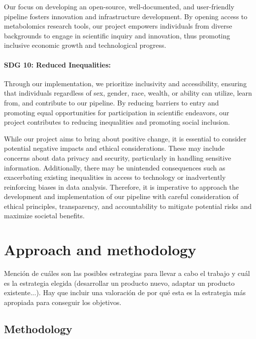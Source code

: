 \documentclass[ENG, BIB]{TFUOC}%
\begin{document}
Our focus on developing an open-source, well-documented, and user-friendly pipeline fosters innovation and infrastructure development. By opening access to metabolomics research tools, our project empowers individuals from diverse backgrounds to engage in scientific inquiry and innovation, thus promoting inclusive economic growth and technological progress.
 
\subsubsection{SDG 10: Reduced Inequalities:} 

Through our implementation, we prioritize inclusivity and accessibility, ensuring that individuals regardless of sex, gender, race, wealth, or ability can utilize, learn from, and contribute to our pipeline. By reducing barriers to entry and promoting equal opportunities for participation in scientific endeavors, our project contributes to reducing inequalities and promoting social inclusion. 

\vspace{18pt}

While our project aims to bring about positive change, it is essential to consider potential negative impacts and ethical considerations. These may include concerns about data privacy and security, particularly in handling sensitive information. Additionally, there may be unintended consequences such as exacerbating existing inequalities in access to technology or inadvertently reinforcing biases in data analysis. Therefore, it is imperative to approach the development and implementation of our pipeline with careful consideration of ethical principles, transparency, and accountability to mitigate potential risks and maximize societal benefits.

\chapter{Approach and methodology}

Mención de cuáles son las posibles estrategias para llevar a cabo el trabajo y cuál es la estrategia elegida (desarrollar un producto nuevo, adaptar un producto existente...). Hay que incluir una valoración de por qué esta es la estrategia más apropiada para conseguir los objetivos.   	

\section{Methodology}
\end{document}
